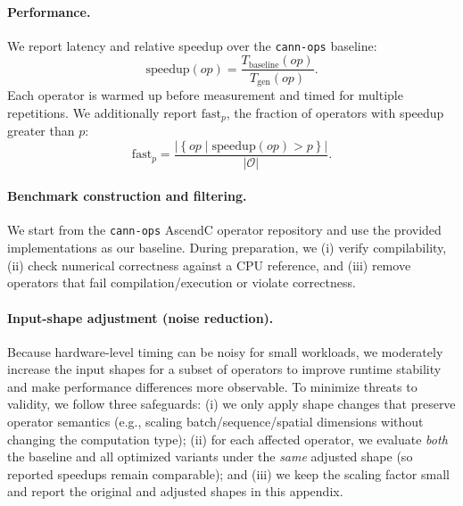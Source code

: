 \documentclass{article}
\theoremstyle{plain}
\theoremstyle{definition}
\theoremstyle{remark}
\begin{document}
\paragraph{Performance.}
We report latency and relative speedup over the \texttt{cann-ops} baseline:
\begin{equation}
\mathrm{speedup}(op) = \frac{T_{\mathrm{baseline}}(op)}{T_{\mathrm{gen}}(op)}.
\end{equation}
Each operator is warmed up before measurement and timed for multiple repetitions.
We additionally report $\mathrm{fast}_p$, the fraction of operators with speedup greater than $p$:
\begin{equation}
\mathrm{fast}_p = \frac{\left|\left\{ op \mid \mathrm{speedup}(op) > p \right\}\right|}{\left|\mathcal{O}\right|}.
\end{equation}

\paragraph{Benchmark construction and filtering.}
We start from the \texttt{cann-ops} AscendC operator repository and use the provided implementations as our baseline.
During preparation, we (i) verify compilability, (ii) check numerical correctness against a CPU reference, and (iii) remove operators that fail compilation/execution or violate correctness.

\paragraph{Input-shape adjustment (noise reduction).}
Because hardware-level timing can be noisy for small workloads, we moderately increase the input shapes for a subset of operators to improve runtime stability and make performance differences more observable. To minimize threats to validity, we follow three safeguards: (i) we only apply shape changes that preserve operator semantics (e.g., scaling batch/sequence/spatial dimensions without changing the computation type); (ii) for each affected operator, we evaluate \emph{both} the baseline and all optimized variants under the \emph{same} adjusted shape (so reported speedups remain comparable); and (iii) we keep the scaling factor small and report the original and adjusted shapes in this appendix.
 
\end{document}
